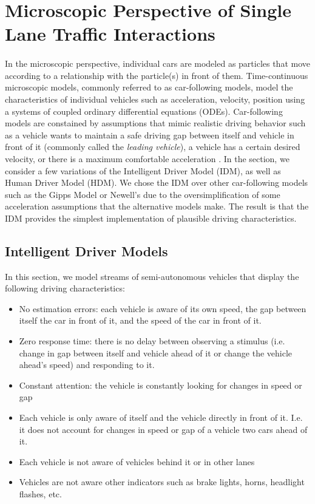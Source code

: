 \documentclass[12pt]{article}
\begin{document}
\section{Microscopic Perspective of Single Lane Traffic Interactions}
\paragraph{} In the microscopic perspective, individual cars are modeled as particles that move according to a relationship with the particle(s) in front of them.  Time-continuous microscopic models, commonly referred to as car-following models, model the characteristics of individual vehicles such as acceleration, velocity, position using a systems of coupled ordinary differential equations (ODEs).  Car-following models are constained by assumptions that mimic realistic driving behavior such as a vehicle wants to maintain a safe driving gap between itself and vehicle in front of it (commonly called the \textit{leading vehicle}), a vehicle has a certain desired velocity, or there is a maximum comfortable acceleration \cite[chapter~10]{treiber_kesting_2013}. In the section, we consider a few variations of the Intelligent Driver Model (IDM), as well as Human Driver Model (HDM).  
We chose the IDM over other car-following models such as the Gipps Model or Newell's due to the oversimplification of some acceleration assumptions that the alternative models make\cite[chapter~11]{treiber_kesting_2013}. The result is that the IDM provides the simplest implementation of plausible driving characteristics.
\subsection{Intelligent Driver Models}
In this section, we model streams of semi-autonomous vehicles that display the following driving characteristics:
\begin{itemize}
  \item No estimation errors: each vehicle is aware of its own speed, the gap between itself the car in front of it, and the speed of the car in front of it.
  \item Zero response time: there is no delay between observing a stimulus (i.e. change in gap between itself and vehicle ahead of it or change the vehicle ahead's speed) and responding to it.
  \item Constant attention: the vehicle is constantly looking for changes in speed or gap
  \item Each vehicle is only aware of itself and the vehicle directly in front of it.  I.e. it does not account for changes in speed or gap of a vehicle two cars ahead of it.
  \item Each vehicle is not aware of vehicles behind it or in other lanes
  \item Vehicles are not aware other indicators such as brake lights, horns, headlight flashes, etc.
\end{itemize}
\end{document}
